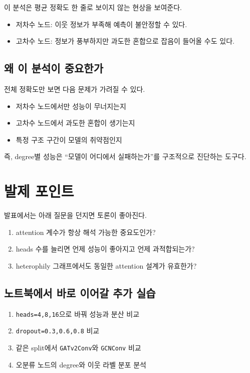 \documentclass[11pt,a4paper]{article}
\begin{document}
이 분석은 평균 정확도 한 줄로 보이지 않는 현상을 보여준다.
\begin{itemize}[leftmargin=*]
  \item 저차수 노드: 이웃 정보가 부족해 예측이 불안정할 수 있다.
  \item 고차수 노드: 정보가 풍부하지만 과도한 혼합으로 잡음이 들어올 수도 있다.
\end{itemize}

\subsection*{왜 이 분석이 중요한가}
전체 정확도만 보면 다음 문제가 가려질 수 있다.
\begin{itemize}[leftmargin=*]
  \item 저차수 노드에서만 성능이 무너지는지
  \item 고차수 노드에서 과도한 혼합이 생기는지
  \item 특정 구조 구간이 모델의 취약점인지
\end{itemize}
즉, degree별 성능은 ``모델이 어디에서 실패하는가''를 구조적으로 진단하는 도구다.

\section{발제 포인트}

발표에서는 아래 질문을 던지면 토론이 좋아진다.
\begin{enumerate}[leftmargin=*]
  \item attention 계수가 항상 해석 가능한 중요도인가?
  \item heads 수를 늘리면 언제 성능이 좋아지고 언제 과적합되는가?
  \item heterophily 그래프에서도 동일한 attention 설계가 유효한가?
\end{enumerate}

\subsection*{노트북에서 바로 이어갈 추가 실습}
\begin{enumerate}[leftmargin=*]
  \item \texttt{heads=4,8,16}으로 바꿔 성능과 분산 비교
  \item \texttt{dropout=0.3,0.6,0.8} 비교
  \item 같은 split에서 \texttt{GATv2Conv}와 \texttt{GCNConv} 비교
  \item 오분류 노드의 degree와 이웃 라벨 분포 분석
\end{enumerate}
\end{document}
